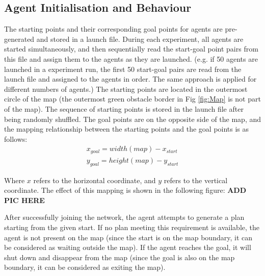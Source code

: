 \subsection*{Agent Initialisation and Behaviour}
\label{chap:agent initialisation}
The starting points and their corresponding goal points for agents are pre-generated and stored in a launch file. 
During each experiment, all agents are started simultaneously, and then sequentially read the start-goal point pairs from this file and assign them to the agents as they are launched.
(e.g. if 50 agents are launched in a experiment run, the first 50 start-goal pairs are read from the launch file and assigned to the agents in order. The same approach is applied for different numbers of agents.)
The starting points are located in the outermost circle of the map (the outermost green obstacle border in Fig \ref{fig:Map} is not part of the map). The sequence of starting points is stored in the launch file after being randomly shuffled.
The goal points are on the opposite side of the map, and the mapping relationship between the starting points and the goal points is as follows:
\begin{align}
    x_{goal} = width(map) - x_{start}  \\
    y_{goal} = height(map) - y_{start} 
\end{align}

Where $x$ refers to the horizontal coordinate, and $y$ refers to the vertical coordinate.
The effect of this mapping is shown in the following figure:
\textbf{ADD PIC HERE} %

After successfully joining the network, the agent attempts to generate a plan starting from the given start. If no plan meeting this requirement is available, the agent is not present on the map (since the start is on the map boundary, it can be considered as waiting outside the map).
If the agent reaches the goal, it will shut down and disappear from the map (since the goal is also on the map boundary, it can be considered as exiting the map).

